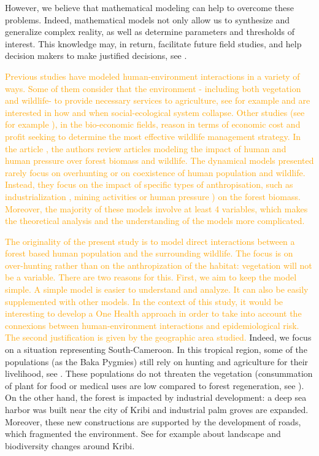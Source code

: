 \documentclass{article}
\newcommand{\vdeux}[1]{\textcolor{orange}{#1}}
\theoremstyle{definition}
\theoremstyle{remark}
\begin{document}
However, we believe that mathematical modeling can help to overcome these problems. Indeed, mathematical models not only allow us to synthesize and generalize complex reality, as well as determine parameters and thresholds of interest. This knowledge may, in return, facilitate future field studies, and help decision makers to make justified decisions, see \cite{deangelis_towards_2021}.

\vdeux{
Previous studies have modeled human-environment interactions in a variety of ways.
Some of them consider that the environment - including both vegetation and wildlife- to provide necessary services to agriculture, see for example \cite{bengochea-paz_agricultural_2020, roman_dynamics_2018} and are interested in how and when social-ecological system collapse. Other studies (see for example \cite{bulte_habitat_2003, nlom_bio-economic_2021}), in the bio-economic fields, reason in terms of economic cost and profit seeking to determine the most effective wildlife management strategy. In the article \cite{fanuel_modelling_2023}, the authors review articles modeling the impact of human and human pressure over forest biomass and wildlife. The dynamical models presented rarely focus on overhunting or on coexistence of human population and wildlife. Instead, they focus on the impact of specific types of anthropisation, such as industrialization \cite{agarwal_depletion_2010}, mining activities or human pressure \cite{dubey_modelling_2009}) on the forest biomass. Moreover, the majority of these models involve at least 4 variables, which makes the theoretical analysis and the understanding of the models more complicated.
}

\vdeux{
The originality of the present study is to model direct interactions between a forest based human population and the surrounding wildlife. The focus is on over-hunting rather than on the anthropization of the habitat: vegetation will not be a variable. There are two reasons for this. First, we aim to keep the model simple. A simple model is easier to understand and analyze. It can also be easily supplemented with other models. In the context of this study, it would be interesting to develop a One Health approach in order to take into account the connexions between human-environment interactions and epidemiological risk. The second justification is given by the geographic area studied.
}
Indeed, we focus on a situation representing South-Cameroon. In this tropical region, some of the populations (as the Baka Pygmies) still rely on hunting and agriculture for their livelihood, see \cite{avila_martin_food_2024}. These populations do not threaten the vegetation (consummation of plant for food or medical uses are low compared to forest regeneration, see \cite{koppert_consommation_1996}). On the other hand, the forest is impacted by industrial development: a deep sea harbor was built near the city of Kribi and industrial palm groves are expanded. Moreover, these new constructions are supported by the development of roads, which fragmented the environment. See for example \cite{foonde_change_2018, romain_deforestation_2017} about landscape and biodiversity changes around Kribi.
\end{document}
